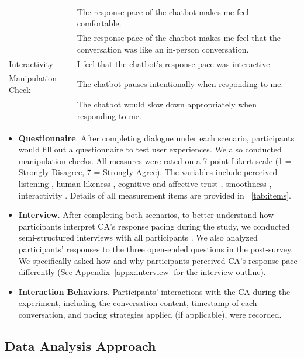 \begin{table}[t!]
\begin{tabular}{llc}
 &   The response pace of the chatbot makes me feel comfortable. &\\
 & The response pace of the chatbot makes me feel that the conversation was like an in-person conversation. &\\
 Interactivity& I feel that the chatbot's response pace was interactive. &\\
Manipulation Check & The chatbot pauses intentionally when responding to me.\\ 
 & The chatbot would slow down appropriately when responding to me.\\
 \bottomrule
    \end{tabular}    
\end{table}

\begin{itemize}
    \item \textbf{Questionnaire}. After completing dialogue under each scenario, participants would fill out a questionnaire to test user experiences. We also conducted manipulation checks. All measures were rated on a 7-point Likert scale (1 = Strongly Disagree, 7 = Strongly Agree). The variables include perceived listening \cite{10.1145/3555164}, human-likeness \cite{bartneck2009measurement}, cognitive and affective trust \cite{johnson2005cognitive}, smoothness \cite{10.1145/2212776.2223750}, interactivity \cite{10.1145/2317956.2318069}. Details of all measurement items are provided in \tablename{~\ref{tab:items}}.
    \item \textbf{Interview}. After completing both scenarios, to better understand how participants interpret CA's response pacing during the study, we conducted semi-structured interviews with all participants \cite{adeoye2021research}. We also analyzed participants' responses to the three open-ended questions in the post-survey. We specifically asked how and why participants perceived CA's response pace differently (See Appendix~\ref{appx:interview} for the interview outline).
    \item \textbf{Interaction Behaviors}. Participants' interactions with the CA during the experiment, including the conversation content, timestamp of each conversation, and pacing strategies applied (if applicable), were recorded.
\end{itemize}



\subsection{Data Analysis Approach}

